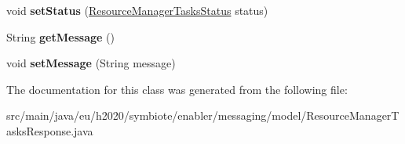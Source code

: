 \begin{DoxyCompactItemize}
void {\bfseries set\+Status} (\hyperlink{enumeu_1_1h2020_1_1symbiote_1_1enabler_1_1messaging_1_1model_1_1ResourceManagerTasksStatus}{Resource\+Manager\+Tasks\+Status} status)
\item 
\mbox{\label{classeu_1_1h2020_1_1symbiote_1_1enabler_1_1messaging_1_1model_1_1ResourceManagerTasksResponse_ad07078abac37537cd1ee495b3921e3f2}} 
String {\bfseries get\+Message} ()
\item 
\mbox{\label{classeu_1_1h2020_1_1symbiote_1_1enabler_1_1messaging_1_1model_1_1ResourceManagerTasksResponse_adc362a606037e67cbbde0c3607b69416}} 
void {\bfseries set\+Message} (String message)
\end{DoxyCompactItemize}


The documentation for this class was generated from the following file\+:\begin{DoxyCompactItemize}
\item 
src/main/java/eu/h2020/symbiote/enabler/messaging/model/Resource\+Manager\+Tasks\+Response.\+java\end{DoxyCompactItemize}
